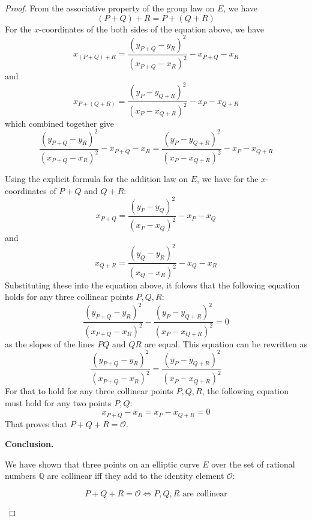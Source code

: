\documentclass[12pt]{article}
\begin{document}
\begin{proof}
From the associative property of the group law on ${E}$, we have
\begin{equation*}
    (P + Q) + R = P + (Q + R)
\end{equation*}
For the $x$-coordinates of the both sides of the equation above, we have
\begin{equation*}
    x_{(P + Q) + R} = \frac{(y_{P+Q}-y_R)^2}{(x_{P+Q}-x_R)^2} - x_{P+Q} - x_R
\end{equation*}
and
\begin{equation*}
    x_{P + (Q + R)} = \frac{(y_P-y_{Q+R})^2}{(x_P-x_{Q+R})^2} - x_P - x_{Q+R}
\end{equation*}
which combined together give
\begin{equation*}
    \frac{(y_{P+Q}-y_R)^2}{(x_{P+Q}-x_R)^2} - x_{P+Q} - x_R = \frac{(y_P-y_{Q+R})^2}{(x_P-x_{Q+R})^2} - x_P - x_{Q+R}   
\end{equation*}

Using the explicit formula for the addition law on ${E}$, we have for the $x$-coordinates of $P + Q$ and $Q + R$:
\begin{equation*}
    x_{P+Q} = \frac{(y_P-y_Q)^2}{(x_P-x_Q)^2} - x_P - x_Q
\end{equation*}
and 
\begin{equation*}
    x_{Q+R} = \frac{(y_Q-y_R)^2}{(x_Q-x_R)^2} - x_Q - x_R
\end{equation*}
Substituting these into the equation above, it folows that the following equation holds for any three collinear points $P, Q, R$:
\begin{equation*}
    \frac{(y_{P+Q}-y_R)^2}{(x_{P+Q}-x_R)^2} - \frac{(y_P-y_{Q+R})^2}{(x_P-x_{Q+R})^2} = 0   
\end{equation*}
as the slopes of the lines $PQ$ and $QR$ are equal. This equation can be rewritten as
\begin{equation*}
    \frac{(y_{P+Q}-y_R)^2}{(x_{P+Q}-x_R)^2} = \frac{(y_P-y_{Q+R})^2}{(x_P-x_{Q+R})^2}
\end{equation*}
For that to hold for any three collinear points $P, Q, R$, the following equation must hold for any two points $P, Q$:
\begin{equation*}
    x_{P+Q} - x_R = x_P - x_{Q+R} = 0
\end{equation*}
That proves that $P + Q + R = \mathcal{O}$.


\item{\textbf{Conclusion.}}


We have shown that three points on an elliptic curve ${E}$ over the set of rational numbers $\mathbb{Q}$ are collinear
iff they add to the identity element $\mathcal{O}$:

\begin{tcolorbox}[colframe=blue, colback=gray!10]
    \begin{equation*}
        P + Q + R = \mathcal{O} \iff P, Q, R \text{ are  collinear}
    \end{equation*}
\end{tcolorbox}


\end{proof}
\end{document}
